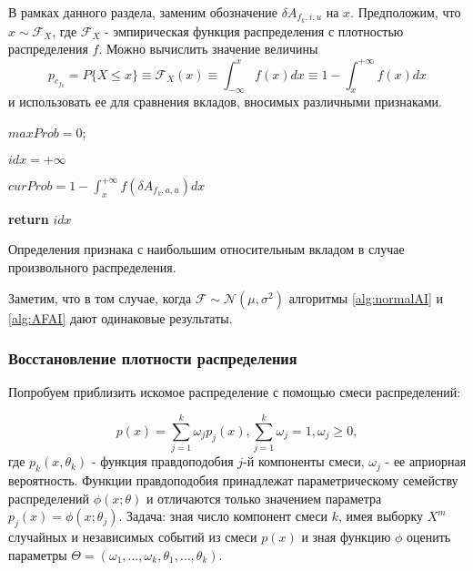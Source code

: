 \documentclass[12pt,a4paper]{report}
\begin{document}
В рамках данного раздела, заменим обозначение $\delta A_{f_k, i, u}$ на $x$.
Предположим, что $x \sim \mathcal{F}_{X}$, где $\mathcal{F}_{X}$ - эмпирическая функция распределения с плотностью распределения $f$. Можно вычислить значение величины 
\begin{equation*}
p_{c_{f_k}} = \textit{P}\{X \le x\} \equiv \mathcal{F}_X(x) \equiv \int_{-\infty}^{x}f(x)dx \equiv 1 - \int_{x}^{+\infty}f(x)dx
\end{equation*}
и использовать ее для сравнения вкладов, вносимых различными признаками.

\begin{algorithm}[H]
\SetAlgoLined
{}

$maxProb = 0$;

$idx = +\infty$

 {

$curProb = 1 - \int_{x}^{+\infty}f(\delta A_{f_k, a, u})dx$

}

\textbf{return} $idx$
\caption{Определения признака с наибольшим относительным вкладом в случае произвольного распределения.}
\label{alg:AFAI}
\end{algorithm}

Заметим, что в том случае, когда $\mathcal{F} \sim \mathcal{N}(\mu, \sigma^2)$ алгоритмы \ref{alg:normalAI} и \ref{alg:AFAI} дают одинаковые результаты.

\subsubsection{Восстановление плотности распределения}
Попробуем приблизить искомое распределение с помощью смеси распределений:

\begin{equation*}
p(x) = \sum_{j=1}^{k}\omega_jp_j(x), \sum_{j=1}^{k}\omega_j = 1, \omega_j \ge 0, 
\end{equation*}
где $p_k(x, \theta_k)$ - функция правдоподобия $j$-й компоненты смеси, $\omega_j$ - ее априорная вероятность. Функции правдоподобия принадлежат параметрическому семейству распределений $\phi(x; \theta)$ и отличаются только значением параметра $p_j(x) = \phi(x; \theta_j)$.
Задача: зная число компонент смеси $k$, имея выборку $X^m$ случайных и независимых событий из смеси $p(x)$ и зная функцию $\phi$ оценить параметры $\Theta = (\omega_1, \dots, \omega_k, \theta_1, \dots, \theta_k)$.
\end{document}

